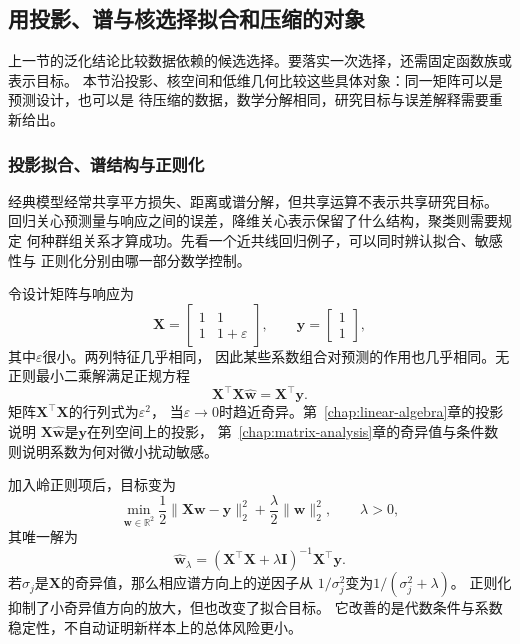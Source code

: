 \subsection{用投影、谱与核选择拟合和压缩的对象}
\label{sec:future-classical-kernel-geometric-representation}

上一节的泛化结论比较数据依赖的候选选择。要落实一次选择，还需固定函数族或表示目标。
本节沿投影、核空间和低维几何比较这些具体对象：同一矩阵可以是预测设计，也可以是
待压缩的数据，数学分解相同，研究目标与误差解释需要重新给出。

\subsubsection{投影拟合、谱结构与正则化}
\label{sec:future-fitting-projection-regularization}

经典模型经常共享平方损失、距离或谱分解，但共享运算不表示共享研究目标。
回归关心预测量与响应之间的误差，降维关心表示保留了什么结构，聚类则需要规定
何种群组关系才算成功。先看一个近共线回归例子，可以同时辨认拟合、敏感性与
正则化分别由哪一部分数学控制。

令设计矩阵与响应为
\[
  \bm{X}
  =
  \begin{bmatrix}
    1 & 1\\
    1 & 1+\varepsilon
  \end{bmatrix},
  \qquad
  \bm{y}
  =
  \begin{bmatrix}
    1\\
    1
  \end{bmatrix},
\]
其中$\varepsilon$很小。两列特征几乎相同，
因此某些系数组合对预测的作用也几乎相同。无正则最小二乘解满足正规方程
\[
  \bm{X}^{\top}\bm{X}\widehat{\bm{w}}
  =
  \bm{X}^{\top}\bm{y}.
\]
矩阵$\bm{X}^{\top}\bm{X}$的行列式为$\varepsilon^2$，
当$\varepsilon\to0$时趋近奇异。第~\ref{chap:linear-algebra}章的投影说明
$\bm{X}\widehat{\bm{w}}$是$\bm{y}$在列空间上的投影，
第~\ref{chap:matrix-analysis}章的奇异值与条件数则说明系数为何对微小扰动敏感。

加入岭正则项后，目标变为
\[
  \min_{\bm{w}\in\mathbb{R}^{2}}
  \frac{1}{2}\lVert\bm{X}\bm{w}-\bm{y}\rVert_2^2
  +
  \frac{\lambda}{2}\lVert\bm{w}\rVert_2^2,
  \qquad \lambda>0,
\]
其唯一解为
\begin{equation}
  \widehat{\bm{w}}_\lambda
  =
  \left(
    \bm{X}^{\top}\bm{X}+\lambda\bm{I}
  \right)^{-1}
  \bm{X}^{\top}\bm{y}.
  \label{eq:future-ridge-solution}
\end{equation}
若$\sigma_j$是$\bm{X}$的奇异值，那么相应谱方向上的逆因子从
$1/\sigma_j^2$变为$1/(\sigma_j^2+\lambda)$。
正则化抑制了小奇异值方向的放大，但也改变了拟合目标。
它改善的是代数条件与系数稳定性，不自动证明新样本上的总体风险更小。

